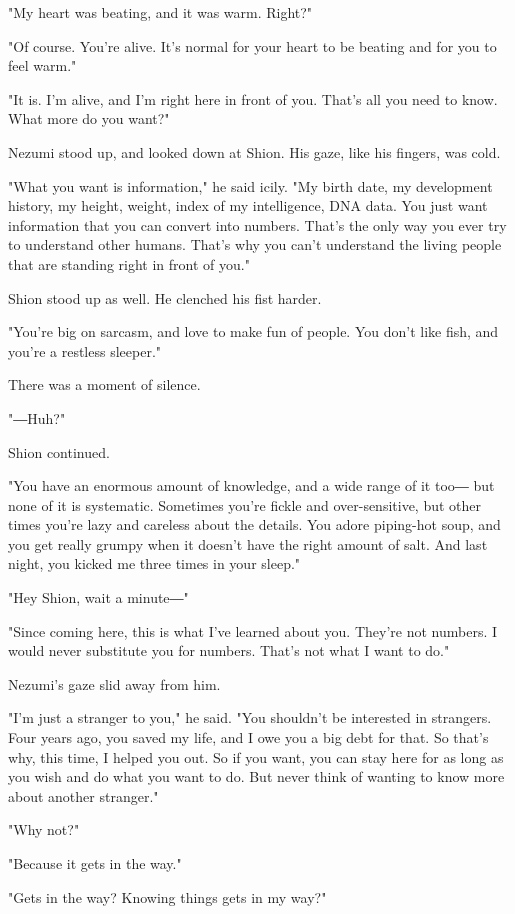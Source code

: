 "My heart was beating, and it was warm. Right?"

"Of course. You're alive. It's normal for your heart to be beating and
for you to feel warm."

"It is. I'm alive, and I'm right here in front of you. That's all you
need to know. What more do you want?"

Nezumi stood up, and looked down at Shion. His gaze, like his fingers,
was cold.

"What you want is information," he said icily. "My birth date, my
development history, my height, weight, index of my intelligence, DNA
data. You just want information that you can convert into numbers.
That's the only way you ever try to understand other humans. That's why
you can't understand the living people that are standing right in front
of you."

Shion stood up as well. He clenched his fist harder.

"You're big on sarcasm, and love to make fun of people. You don't like
fish, and you're a restless sleeper."

There was a moment of silence.

"―Huh?"

Shion continued.

"You have an enormous amount of knowledge, and a wide range of it too―
but none of it is systematic. Sometimes you're fickle and
over-sensitive, but other times you're lazy and careless about the
details. You adore piping-hot soup, and you get really grumpy when it
doesn't have the right amount of salt. And last night, you kicked me
three times in your sleep."

"Hey Shion, wait a minute―"

"Since coming here, this is what I've learned about you. They're not
numbers. I would never substitute you for numbers. That's not what I
want to do."

Nezumi's gaze slid away from him.

"I'm just a stranger to you," he said. "You shouldn't be interested in
strangers. Four years ago, you saved my life, and I owe you a big debt
for that. So that's why, this time, I helped you out. So if you want,
you can stay here for as long as you wish and do what you want to do.
But never think of wanting to know more about another stranger."

"Why not?"

"Because it gets in the way."

"Gets in the way? Knowing things gets in my way?"

